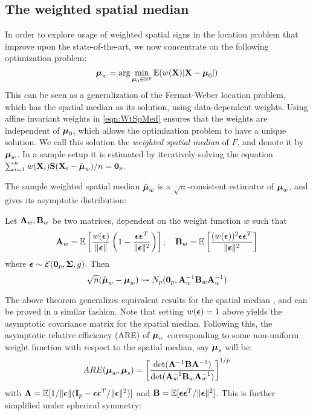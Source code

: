 \subsection{The weighted spatial median} 

In order to explore usage of weighted spatial signs in the location problem that improve upon the state-of-the-art, we now concentrate on the following optimization problem:
%
\begin{equation}\label{eqn:WtSpMed}
{\boldsymbol{\mu}}_w = \text{arg}\min_{{\boldsymbol{\mu}}_0 \in \mathbb{R}^p} {\mathbb{E}} ( w({\mathbf{X}}) | {\mathbf{X}} - {\boldsymbol{\mu}}_0 |)
\end{equation}
%
This can be seen as a generalization of the Fermat-Weber location problem, which has the spatial median \citep{brown83, Chaudhuri96} as its solution, using data-dependent weights. Using affine invariant weights in \ref{eqn:WtSpMed} ensures that the weights are independent of ${\boldsymbol{\mu}}_0$, which allows the optimization problem to have a unique solution. We call this solution the \textit{weighted spatial median} of $F$, and denote it by ${\boldsymbol{\mu}}_w$. In a sample setup it is estimated by iteratively solving the equation $\sum_{i=1}^n w({\mathbf{X}}_i) {\mathbf{S}} ({\mathbf{X}}_i - \hat{{\boldsymbol{\mu}}}_w)/n = {\bf 0}_p$.

The sample weighted spatial median $\hat{{\boldsymbol{\mu}}}_w$ is a $\sqrt n$-consistent estimator of ${\boldsymbol{\mu}}_w$, and gives its asymptotic distribution:
%
\begin{Theorem}
Let ${\mathbf{A}}_w, {\mathbf{B}}_w$ be two matrices, dependent on the weight function $w$ such that
%
$$
{\mathbf{A}}_w = {\mathbb{E}} \left[ \frac{w( {\boldsymbol{\epsilon}} ) }{\| {\boldsymbol{\epsilon}} \|} \left( 1 - \frac{{\boldsymbol{\epsilon}} {\boldsymbol{\epsilon}}^T}{\| {\boldsymbol{\epsilon}} \|^2} \right) \right]; \quad {\mathbf{B}}_w = {\mathbb{E}} \left[ \frac{(w( {\boldsymbol{\epsilon}} ))^2 {\boldsymbol{\epsilon}} {\boldsymbol{\epsilon}}^T}{\| {\boldsymbol{\epsilon}} \|^2} \right]
$$
%
where ${\boldsymbol{\epsilon}} \sim \mathcal E({\bf 0}_p, {\boldsymbol{\Sigma}}, g)$. Then
%
\begin{equation}
\sqrt n (\hat{{\boldsymbol{\mu}}}_w - {\boldsymbol{\mu}}_w) \leadsto N_p ({\bf 0}_p, {\mathbf{A}}_w^{-1} {\mathbf{B}}_w {\mathbf{A}}_w^{-1})
\end{equation}
\end{Theorem}
%

The above theorem generalizes equivalent results for the spatial median \citep{OjaBook10}, and can be proved in a similar fashion. Note that setting $w({\boldsymbol{\epsilon}})=1$ above yields the asymptotic covariance matrix for the spatial median. Following this, the asymptotic relative efficiency (ARE) of ${\boldsymbol{\mu}}_w$ corresponding to some non-uniform weight function with respect to the spatial median, say ${\boldsymbol{\mu}}_s$ will be:
%
\begin{align}\label{eqn:AREEqn}
ARE( {\boldsymbol{\mu}}_w, {\boldsymbol{\mu}}_s) = \left[ \frac{\text{det} ({\mathbf{A}}^{-1} {\mathbf{B}} {\mathbf{A}}^{-1})}{\text{det} ({\mathbf{A}}_w^{-1} {\mathbf{B}}_w {\mathbf{A}}_w^{-1})} \right]^{1/p}
\end{align}
%
with ${\mathbf{A}} = {\mathbb{E}} [ 1/ \| {\boldsymbol{\epsilon}} \| ( {\mathbf{I}}_p - {\boldsymbol{\epsilon}} {\boldsymbol{\epsilon}}^T/ \| {\boldsymbol{\epsilon}} \|^2 ) ]$ and ${\mathbf{B}} = {\mathbb{E}} [ {\boldsymbol{\epsilon}} {\boldsymbol{\epsilon}}^T/ \| {\boldsymbol{\epsilon}} \|^2 ]$. This is further simplified under spherical symmetry:

